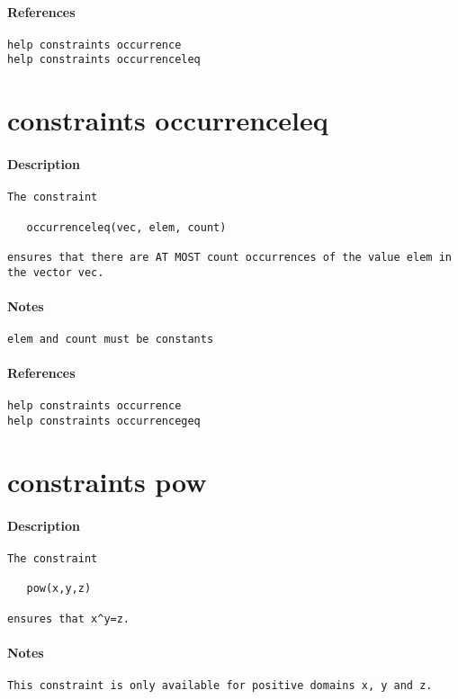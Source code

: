 \paragraph{References}
{\footnotesize
\begin{verbatim}
help constraints occurrence
help constraints occurrenceleq
\end{verbatim}
}
\section{constraints occurrenceleq}
\paragraph{Description}
{\footnotesize
\begin{verbatim}
The constraint

   occurrenceleq(vec, elem, count)

ensures that there are AT MOST count occurrences of the value elem in
the vector vec.
\end{verbatim}
}
\paragraph{Notes}
{\footnotesize
\begin{verbatim}
elem and count must be constants
\end{verbatim}
}
\paragraph{References}
{\footnotesize
\begin{verbatim}
help constraints occurrence
help constraints occurrencegeq
\end{verbatim}
}
\section{constraints pow}
\paragraph{Description}
{\footnotesize
\begin{verbatim}
The constraint
 
   pow(x,y,z)

ensures that x^y=z.
\end{verbatim}
}
\paragraph{Notes}
{\footnotesize
\begin{verbatim}
This constraint is only available for positive domains x, y and z.
\end{verbatim}
}
